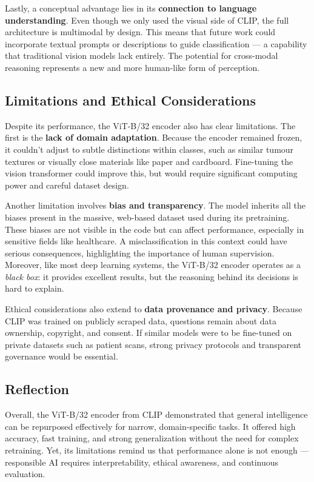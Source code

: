 \documentclass[12pt]{article}
\begin{document}
Lastly, a conceptual advantage lies in its \textbf{connection to language understanding}. Even though we only used the visual side of CLIP, the full architecture is multimodal by design. This means that future work could incorporate textual prompts or descriptions to guide classification — a capability that traditional vision models lack entirely. The potential for cross-modal reasoning represents a new and more human-like form of perception.

\subsection{Limitations and Ethical Considerations}
Despite its performance, the ViT-B/32 encoder also has clear limitations. The first is the \textbf{lack of domain adaptation}. Because the encoder remained frozen, it couldn’t adjust to subtle distinctions within classes, such as similar tumour textures or visually close materials like paper and cardboard. Fine-tuning the vision transformer could improve this, but would require significant computing power and careful dataset design.

Another limitation involves \textbf{bias and transparency}. The model inherits all the biases present in the massive, web-based dataset used during its pretraining. These biases are not visible in the code but can affect performance, especially in sensitive fields like healthcare. A misclassification in this context could have serious consequences, highlighting the importance of human supervision. Moreover, like most deep learning systems, the ViT-B/32 encoder operates as a \textit{black box}: it provides excellent results, but the reasoning behind its decisions is hard to explain.

Ethical considerations also extend to \textbf{data provenance and privacy}. Because CLIP was trained on publicly scraped data, questions remain about data ownership, copyright, and consent. If similar models were to be fine-tuned on private datasets such as patient scans, strong privacy protocols and transparent governance would be essential.

\subsection{Reflection}
Overall, the ViT-B/32 encoder from CLIP demonstrated that general intelligence can be repurposed effectively for narrow, domain-specific tasks. It offered high accuracy, fast training, and strong generalization without the need for complex retraining. Yet, its limitations remind us that performance alone is not enough — responsible AI requires interpretability, ethical awareness, and continuous evaluation.  
\vspace{0.3em}
\end{document}
